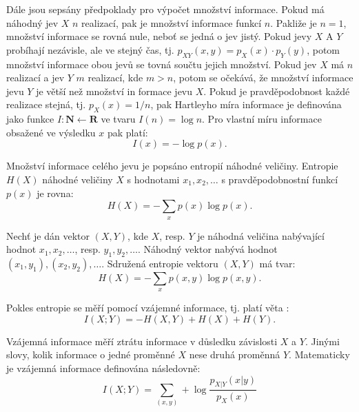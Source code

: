 Dále jsou sepsány předpoklady pro výpočet množství informace. Pokud má náhodný jev $X$ $n$ realizací, pak je množství informace funkcí $n$. Pakliže je $n=1$, množství informace se rovná nule, neboť se jedná o jev jistý. 
Pokud jevy $X$ A $Y$ probíhají nezávisle, ale ve stejný čas, tj. $p_{XY}(x,y)=p_X(x)\cdot p_Y(y)$, potom množství informace obou jevů se tovná součtu jejich množství.
Pokud jev $X$ má $n $ realizací a jev $Y$ $m$ realizací, kde $m>n$, potom se očekává, že množství informace jevu $Y$ je větší než množství in
formace jevu $X$. \cite{bib:MI2} Pokud je pravděpodobnost každé realizace stejná, tj. $p_X(x) = 1/n$, pak  Hartleyho míra informace je definována jako funkce $I: \mathbf{N} \leftarrow \mathbf{R}$ ve tvaru $I(n)=\log n$. Pro vlastní míru informace obsažené ve výsledku $x$ pak platí: \cite{bib:MI2, bib:MI3}
 \begin{equation}
    I(x)=- \log p(x).
 \end{equation}

Množství informace celého jevu je popsáno entropií náhodné veličiny. Entropie $H(X)$ náhodné veličiny $X$ s hodnotami $x_1, x_2, \ldots $ s pravděpodobnostní funkcí $p(x)$ je rovna: \cite{bib:MI2,bib:literatura}
 \begin{equation}
    H(X) = -\sum_x p(x) \log p(x).
 \end{equation}

Nechť je dán vektor $(X,Y)$, kde $X$, resp. $Y$ je náhodná veličina nabývající hodnot $x_1, x_2, \ldots $, resp. $y_1, y_2, \ldots$. Náhodný vektor nabývá hodnot $(x_1, y_1), (x_2, y_2), \ldots $. Sdružená entropie vektoru  $(X,Y)$ má tvar: \cite{bib:MI, bib:MI3}
\begin{equation}
    H(X) = -\sum_x p(x,y) \log p(x,y).
 \end{equation}

Pokles entropie se měří pomocí vzájemné informace, tj. platí věta \cite{bib:MI3}:
\begin{equation}
    I(X;Y) = -H(X,Y)+H(X)+H(Y).
 \end{equation}

Vzájemná informace měří ztrátu informace v důsledku závislosti $X$ a $Y$. Jinými slovy, kolik informace o jedné proměnné $X$ nese druhá proměnná $Y$. Matematicky je vzájemná informace definována následovně: \cite{bib:MI, bib:MI3, bib:literatura}
\begin{equation}
    I(X;Y) = \sum_{(x,y)} + \log \frac{p_{X\vert Y}(x\vert y)}{p_X(x)}
\end{equation}

